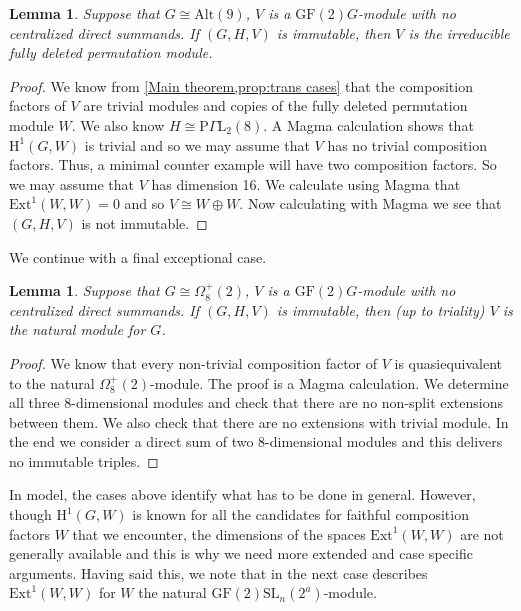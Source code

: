 \documentclass[12pt]{amsart}
\newtheorem{lemma}[theorem]{Lemma}
\theoremstyle{remark}
\theoremstyle{notation}
\theoremstyle{definition}
\newcommand{\GammaL}{\Gamma\mathrm{L}}
\newcommand{\GF}{\mathrm{GF}}
\newcommand{\SL}{\mathrm{SL}}
\newcommand{\0}{\emptyset}
\newcommand{\Alt}{\mathrm{Alt}}
\begin{document}
\begin{lemma}\label{lem:A9 done}
Suppose that $G\cong \Alt(9)$, $V$ is a $\GF(2)G$-module with no centralized direct summands. If $(G,H,V)$ is immutable, then $V$ is the irreducible fully deleted permutation module.
\end{lemma}

\begin{proof} We know from \cref{Main theorem,prop:trans cases} that the composition factors of $V$ are trivial modules and   copies of the fully deleted permutation module $W$. We also know $H \cong \mathrm P\GammaL_2(8)$. A {\sc Magma} calculation shows that $\mathrm H^1(G,W)$ is trivial and so  we may assume that $V$ has no trivial composition factors. Thus,  a minimal counter example will have two composition factors. So we may assume that $V$ has dimension 16. We calculate using {\sc Magma} that $\mathrm {Ext}^1(W,W)=0$ and so $V \cong W\oplus W$. Now calculating with {\sc Magma}  we see that $(G,H,V)$ is not immutable.
\end{proof}




We continue with a final exceptional case.
\begin{lemma}\label{lem:Omega82-A9 done}
Suppose that $G\cong \Omega_8^+(2)$, $V$ is a $\GF(2)G$-module with no centralized direct summands. If $(G,H,V)$ is immutable, then (up to triality) $V$ is the natural module for $G$.
\end{lemma}

\begin{proof} We know that every non-trivial composition factor of $V$ is quasiequivalent to the natural $\Omega_8^+(2)$-module.
The proof is a {\sc Magma} calculation. We determine all three $8$-dimensional modules and check that there are no non-split extensions between them. We also check that there are no extensions with trivial module. In the end we consider a direct sum of two $8$-dimensional modules and this delivers no immutable triples.
\end{proof}

In model, the  cases above identify what has to be done in general. However, though $\mathrm H^1(G,W)$ is known for all the candidates for faithful composition factors $W$ that we encounter, the dimensions of the spaces $\mathrm{Ext}^1(W,W)$ are not generally available and this is why we need more extended and case specific arguments. Having said this, we note that in the next case \cite{Bell} describes $\mathrm{Ext}^1(W,W)$ for $W$ the natural $\GF(2)\SL_n(2^a)$-module.
\end{document}

